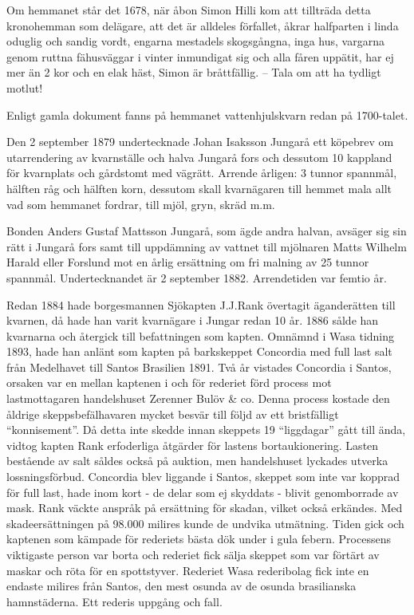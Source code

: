 Om hemmanet står det 1678, när åbon Simon Hilli kom att tillträda detta kronohemman som delägare, att det är alldeles förfallet, åkrar halfparten i linda oduglig och sandig vordt, engarna mestadels skogsgångna, inga hus, vargarna genom ruttna fähusväggar i vinter inmundigat sig och alla fåren uppätit, har ej mer än 2 kor och en elak häst, Simon är bråttfällig. -- Tala om att ha tydligt motlut!



%

\jhnooccupant{}


Enligt gamla dokument fanns på hemmanet vattenhjulskvarn redan på 1700-talet.

Den 2 september 1879 undertecknade Johan Isaksson Jungarå ett köpebrev om utarrendering av kvarnställe och halva Jungarå fors och dessutom 10 kappland för kvarnplats och gårdstomt med vägrätt. Arrende årligen: 3 tunnor spannmål, hälften råg och hälften korn, dessutom skall kvarnägaren till hemmet mala allt vad som hemmanet fordrar, till mjöl, gryn, skräd m.m.

Bonden Anders Gustaf Mattsson Jungarå, som ägde andra halvan, avsäger sig sin rätt i Jungarå fors samt till uppdämning av vattnet till mjölnaren Matts Wilhelm Harald eller Forslund mot en årlig ersättning om fri malning av 25 tunnor 	spannmål. Undertecknandet är 2 september 1882. Arrendetiden var femtio år.


Redan 1884 hade borgesmannen Sjökapten J.J.Rank övertagit äganderätten till kvarnen, då hade han varit kvarnägare i Jungar redan 10 år. 1886 sålde han kvarnarna och återgick till befattningen som kapten. Omnämnd i Wasa tidning 1893, hade han anlänt som kapten på barkskeppet Concordia med full last salt från Medelhavet till Santos Brasilien 1891. Två år vistades Concordia i Santos, orsaken var en mellan kaptenen i och för rederiet förd process mot lastmottagaren handelshuset Zerenner Bulöv \& co. Denna process kostade den åldrige skeppsbefälhavaren mycket besvär till följd av ett bristfälligt ``konnisement''. Då detta inte skedde innan skeppets 19 ``liggdagar'' gått till ända, vidtog kapten Rank erfoderliga åtgärder för lastens bortaukionering. Lasten bestående av salt såldes också på auktion, men handelshuset lyckades utverka lossningsförbud. Concordia blev liggande i Santos, skeppet som inte var kopprad för full last, hade inom kort - de delar som ej skyddats - blivit genomborrade av mask. Rank väckte anspråk på ersättning för skadan, vilket också erkändes. Med skadeersättningen på 98.000 milires kunde de undvika utmätning. Tiden gick och kaptenen som kämpade för rederiets bästa dök under i gula febern. Processens viktigaste person var borta och rederiet fick sälja skeppet som var förtärt av maskar och röta för en spottstyver. Rederiet Wasa rederibolag fick inte en endaste milires från Santos, den mest osunda av de osunda brasilianska hamnstäderna. Ett rederis uppgång och fall.

